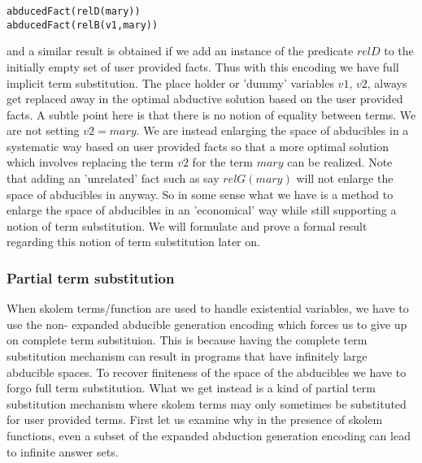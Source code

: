 \documentclass{article}
\begin{document}
\begin{verbatim}
abducedFact(relD(mary)) 
abducedFact(relB(v1,mary))
\end{verbatim} and a similar result is obtained if we add an instance of the predicate $relD$ to the initially empty set of user provided facts. Thus with this encoding we have full implicit term substitution. The place holder or 'dummy' variables $v1$, $v2$, always get replaced away in the optimal abductive solution based on the user provided facts. A subtle point here is that there is no notion of equality between terms. We are not setting $v2 = mary$. We are instead enlarging the space of abducibles in a systematic way based on user provided facts so that a more optimal solution which involves replacing the term $v2$ for the term $mary$ can be realized. Note that adding an 'unrelated' fact such as say $relG(mary)$ will not enlarge the space of abducibles in anyway. So in some sense what we have is a method to enlarge the space of abducibles in an 'economical' way while still supporting a notion of term substitution. We will formulate and prove a formal result regarding this notion of term substitution later on. 
\subsubsection{Partial term substitution}
When skolem terms/function are used to handle existential variables, we have to use the non- expanded abducible generation encoding which forces us to give up on complete term substituion.  This is because having the complete term substitution mechanism can result in programs that have infinitely large abducible spaces. To recover finiteness of the space of the abducibles we have to forgo full term substitution. What we get instead is a kind of partial term substitution mechanism where skolem terms may only sometimes be substituted for user provided terms.  First let us examine why in the presence of skolem functions, even a subset of the expanded abduction generation encoding can lead to infinite answer sets.
\end{document}
